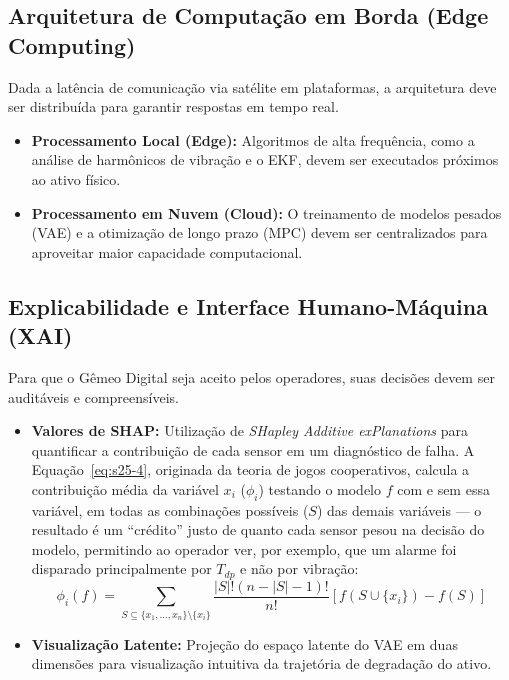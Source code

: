 \documentclass[12pt,a4paper]{article}
\numberwithin{equation}{section}
\numberwithin{table}{section}
\numberwithin{figure}{section}
\begin{document}
	\subsection{Arquitetura de Computação em Borda (Edge Computing)}
	Dada a latência de comunicação via satélite em plataformas, a arquitetura deve ser distribuída para garantir respostas em tempo real.
	\begin{itemize}
		\item \textbf{Processamento Local (Edge):} Algoritmos de alta frequência, como a análise de harmônicos de vibração e o EKF, devem ser executados próximos ao ativo físico.
		\item \textbf{Processamento em Nuvem (Cloud):} O treinamento de modelos pesados (VAE) e a otimização de longo prazo (MPC) devem ser centralizados para aproveitar maior capacidade computacional.
	\end{itemize}
	
	\subsection{Explicabilidade e Interface Humano-Máquina (XAI)}
	Para que o Gêmeo Digital seja aceito pelos operadores, suas decisões devem ser auditáveis e compreensíveis.
	\begin{itemize}
		\item \textbf{Valores de SHAP:} Utilização de \textit{SHapley Additive exPlanations} para quantificar a contribuição de cada sensor em um diagnóstico de falha. A Equação~\eqref{eq:s25-4}, originada da teoria de jogos cooperativos, calcula a contribuição média da variável $x_i$ ($\phi_i$) testando o modelo $f$ com e sem essa variável, em todas as combinações possíveis ($S$) das demais variáveis — o resultado é um ``crédito'' justo de quanto cada sensor pesou na decisão do modelo, permitindo ao operador ver, por exemplo, que um alarme foi disparado principalmente por $T_{dp}$ e não por vibração:
		\begin{equation}\label{eq:s25-4}
 \phi_i(f) = \sum_{S \subseteq \{x_1, \dots, x_n\} \setminus \{x_i\}} \frac{|S|! (n - |S| - 1)!}{n!} [f(S \cup \{x_i\}) - f(S)]
\end{equation}
		\item \textbf{Visualização Latente:} Projeção do espaço latente do VAE em duas dimensões para visualização intuitiva da trajetória de degradação do ativo.
	\end{itemize}
	
\end{document}

